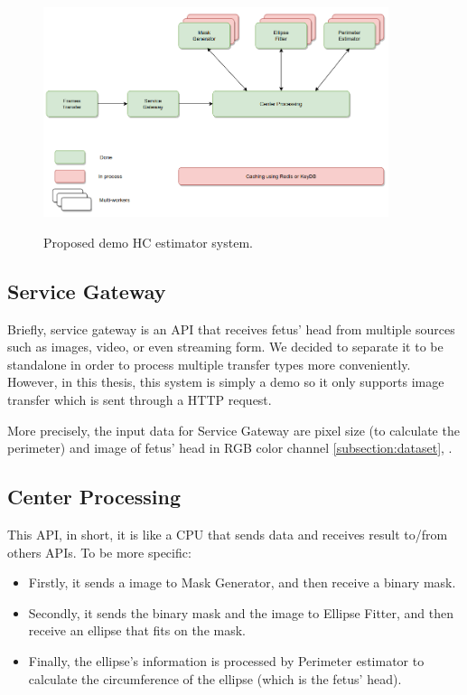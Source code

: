 	\begin{figure}[H]
		\centering
		{\includegraphics[width=0.9\textwidth]{./hinhanh/chap6/hc_system.png}}
		\caption{Proposed demo HC estimator system.}
		\label{fig:hc_system}
	\end{figure}

\subsection{Service Gateway}
\noindent

	Briefly, service gateway is an API that receives fetus' head from multiple sources such as images, video, or even streaming form. We decided to separate it to be standalone in order to process multiple transfer types more conveniently. However, in this thesis, this system is simply a demo so it only supports image transfer which is sent through a HTTP request.
	
	More precisely, the input data for Service Gateway are pixel size (to calculate the perimeter) and image of fetus' head in RGB color channel \ref{subsection:dataset}, .
	
\subsection{Center Processing}
\noindent

	This API, in short, it is like a CPU that sends data and receives result to/from others APIs. To be more specific:
	
	\begin{itemize}
		\item Firstly, it sends a image to Mask Generator, and then receive a binary mask.
		\item Secondly, it sends the binary mask and the image to Ellipse Fitter, and then receive an ellipse that fits on the mask.
		\item Finally, the ellipse's information is processed by Perimeter estimator to calculate the circumference of the ellipse (which is the fetus' head).
	\end{itemize}
	
